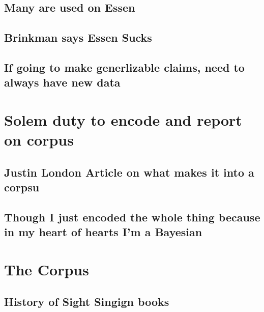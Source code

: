 \documentclass[]{book}
\theoremstyle{definition}
\theoremstyle{definition}
\theoremstyle{definition}
\theoremstyle{remark}
\begin{document}
\hypertarget{many-are-used-on-essen}{%
\subsection{Many are used on Essen}\label{many-are-used-on-essen}}

\hypertarget{brinkman-says-essen-sucks}{%
\subsection{Brinkman says Essen Sucks}\label{brinkman-says-essen-sucks}}

\hypertarget{if-going-to-make-generlizable-claims-need-to-always-have-new-data}{%
\subsection{If going to make generlizable claims, need to always have
new
data}\label{if-going-to-make-generlizable-claims-need-to-always-have-new-data}}

\hypertarget{solem-duty-to-encode-and-report-on-corpus}{%
\section{Solem duty to encode and report on
corpus}\label{solem-duty-to-encode-and-report-on-corpus}}

\hypertarget{justin-london-article-on-what-makes-it-into-a-corpsu}{%
\subsection{Justin London Article on what makes it into a
corpsu}\label{justin-london-article-on-what-makes-it-into-a-corpsu}}

\hypertarget{though-i-just-encoded-the-whole-thing-because-in-my-heart-of-hearts-im-a-bayesian}{%
\subsection{Though I just encoded the whole thing because in my heart of
hearts I'm a
Bayesian}\label{though-i-just-encoded-the-whole-thing-because-in-my-heart-of-hearts-im-a-bayesian}}

\hypertarget{the-corpus}{%
\section{The Corpus}\label{the-corpus}}

\hypertarget{history-of-sight-singign-books}{%
\subsection{History of Sight Singign
books}\label{history-of-sight-singign-books}}
\end{document}
